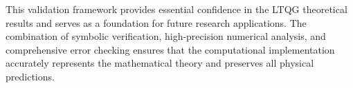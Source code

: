 This validation framework provides essential confidence in the LTQG theoretical results and serves as a foundation for future research applications. The combination of symbolic verification, high-precision numerical analysis, and comprehensive error checking ensures that the computational implementation accurately represents the mathematical theory and preserves all physical predictions.